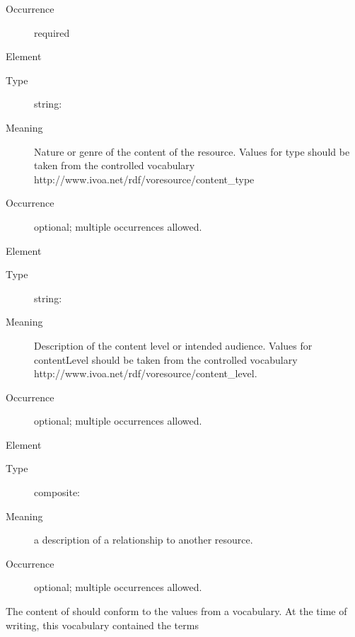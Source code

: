 \documentclass[11pt,a4paper]{ivoa}
\begin{document}
\begin{generated}
\begin{bigdescription}
\begin{description}
\item[Occurrence] required

\end{description}
\item[Element \xmlel{type}]
\begin{description}
\item[Type] string: 
\item[Meaning] 
               Nature or genre of the content of the resource.  Values for
               type should be taken from the controlled vocabulary
               http://www.ivoa.net/rdf/voresource/content\_type
             
\item[Occurrence] optional; multiple occurrences allowed.

\end{description}
\item[Element \xmlel{contentLevel}]
\begin{description}
\item[Type] string: 
\item[Meaning] 
                Description of the content level or intended audience.
                Values for contentLevel should be taken from the controlled
                vocabulary
                http://www.ivoa.net/rdf/voresource/content\_level.
             
\item[Occurrence] optional; multiple occurrences allowed.

\end{description}
\item[Element \xmlel{relationship}]
\begin{description}
\item[Type] composite: 
\item[Meaning] 
               a description of a relationship to another resource.  
             
\item[Occurrence] optional; multiple occurrences allowed.

\end{description}


\end{bigdescription}\endgroup

\endgroup
\end{generated}


The content of  should conform to the values from a
vocabulary.  At the time of writing, this vocabulary contained the terms
\end{document}
